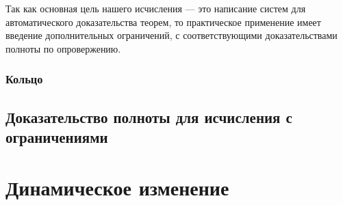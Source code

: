 Так как основная цель нашего исчисления --- это написание систем для автоматического доказательства теорем, то практическое применение имеет введение дополнительных ограничений, с соответствующими доказательствами полноты по опровержению.

\subsubsection{Кольцо}

\subsection{Доказательство полноты для исчисления с ограничениями}

\section{Динамическое изменение}
\label{sec:onlineChanging}